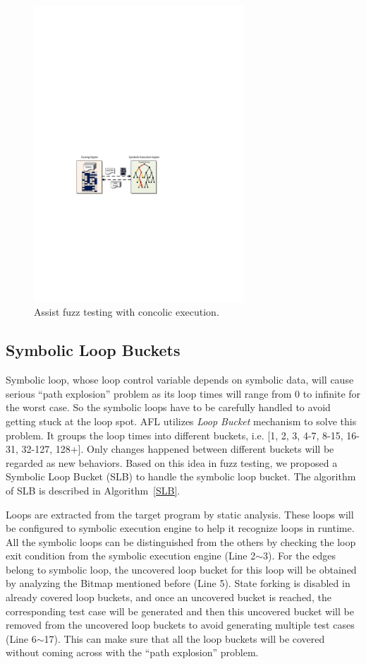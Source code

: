 \begin{figure}
\centering
\includegraphics[width=0.7\textwidth]{figures/s2e-assist.pdf} 
\caption{Assist fuzz testing with concolic execution.}\label{s2e-assist}
\end{figure}


\subsection{Symbolic Loop Buckets}
Symbolic loop, whose loop control variable depends on symbolic data, will cause serious ``path explosion'' problem as its loop times will range from 0 to infinite for the worst case. So the symbolic loops have to be carefully handled to avoid getting stuck at the loop spot. AFL utilizes \emph{Loop Bucket} mechanism to solve this problem. It groups the loop times into different buckets, i.e. [1, 2, 3, 4-7, 8-15, 16-31, 32-127, 128+]. Only changes happened between different buckets will be regarded as new behaviors. Based on this idea in fuzz testing, we proposed a Symbolic Loop Bucket (SLB) to handle the symbolic loop bucket. The algorithm of SLB is described in Algorithm~\ref{SLB}.

Loops are extracted from the target program by static analysis. These loops will be configured to symbolic execution engine to help it recognize loops in runtime. All the symbolic loops can be distinguished from the others by checking the loop exit condition from the symbolic execution engine (Line 2$\sim$3). For the edges belong to symbolic loop, the uncovered loop bucket for this loop will be obtained by analyzing the Bitmap mentioned before (Line 5). State forking is disabled in already covered loop buckets, and once an uncovered bucket is reached, the corresponding test case will be generated and then this uncovered bucket will be removed from the uncovered loop buckets to avoid generating multiple test cases (Line 6$\sim$17). This can make sure that all the loop buckets will be covered without coming across with the ``path explosion'' problem.

